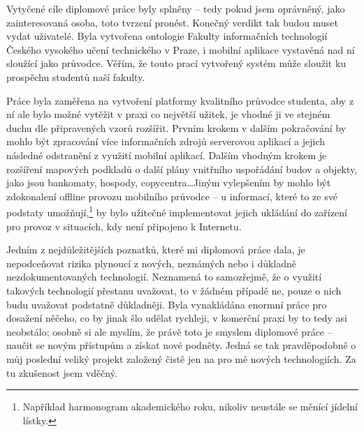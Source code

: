 \begin{conclusion}
Vytyčené cíle diplomové práce byly splněny -- tedy pokud jsem oprávněný, jako zainteresovaná osoba, toto tvrzení pronést. Konečný verdikt tak budou muset vydat uživatelé. Byla vytvořena ontologie Fakulty informačních technologií Českého vysokého učení technického v Praze, i mobilní aplikace vystavěná nad ní sloužící jako průvodce. Věřím, že touto prací vytvořený systém může sloužit ku prospěchu studentů naší fakulty.

Práce byla zaměřena na vytvoření platformy kvalitního průvodce studenta, aby z ní ale bylo možné vytěžit v praxi co největší užitek, je vhodné ji ve stejném duchu dle připravených vzorů rozšířit. Prvním krokem v dalším pokračování by mohlo být zpracování více informačních zdrojů serverovou aplikací a jejich následné odstranění z využití mobilní aplikací. Dalším vhodným krokem je rozšíření mapových podkladů o další plány vnitřního uspořádání budov a objekty, jako jsou bankomaty, hospody, copycentra\dots Jiným vylepšením by mohlo být zdokonalení offline provozu mobilního průvodce -- u informací, které to ze své podstaty umožňují,\footnote{Například harmonogram akademického roku, nikoliv neustále se měnící jídelní lístky.} by bylo užitečné implementovat jejich ukládání do zařízení pro provoz v situacích, kdy není připojeno k Internetu.

Jedním z nejdůležitějších poznatků, které mi diplomová práce dala, je nepodceňovat rizika plynoucí z nových, neznámých nebo i důkladně nezdokumentovaných technologií. Neznamená to samozřejmě, že o využití takových technologií přestanu uvažovat, to v žádném případě ne, pouze o nich budu uvažovat podstatně důkladněji. Byla vynakládána enormní práce pro dosažení něčeho, co by jinak šlo udělat rychleji, v komerční praxi by to tedy asi neobstálo; osobně si ale myslím, že právě toto je smyslem diplomové práce -- naučit se novým přístupům a získat nové podněty. Jedná se tak pravděpodobně o můj poslední veliký projekt založený čistě jen na pro mě nových technologiích. Za tu zkušenost jsem vděčný.
\end{conclusion}
